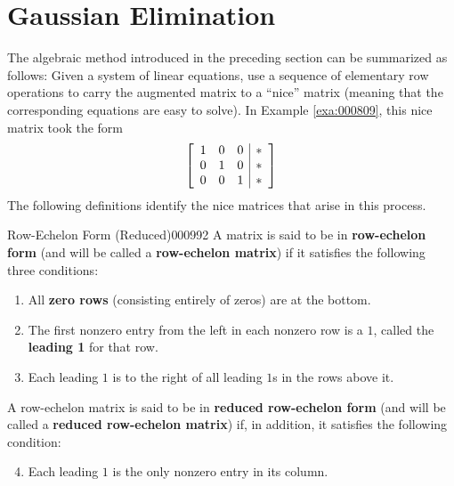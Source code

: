 \section{Gaussian Elimination}
\label{sec:1_2}

The algebraic method introduced in the preceding section can be summarized as follows: Given a system of linear equations, use a sequence of elementary row operations to carry the augmented matrix to a ``nice'' matrix (meaning that the corresponding equations are easy to solve). In Example \ref{exa:000809}, this nice matrix took the form
\begin{equation*}
\left[ \begin{array}{rrr|r}
	1 & 0 & 0 & * \\
	0 & 1 & 0 & * \\
	0 & 0 & 1 & *
\end{array} \right]
\end{equation*}
The following definitions identify the nice matrices that arise in this process.

\newpage
\begin{definition}{Row-Echelon Form (Reduced)}{000992}
A matrix is said to be in \textbf{row-echelon form} (and will be called a \textbf{row-echelon matrix}) if it satisfies the following three conditions:

\begin{enumerate}
\item All \textbf{zero rows} (consisting entirely of zeros) are at the bottom.

\item The first nonzero entry from the left in each nonzero row is a $1$, called the \textbf{leading 1} for that row.

\item Each leading $1$ is to the right of all leading $1$s in the rows above it.

\end{enumerate}

A row-echelon matrix is said to be in \textbf{reduced row-echelon form} (and will be called a \textbf{reduced row-echelon matrix}) if, in addition, it satisfies the following condition:

\begin{enumerate}
\setcounter{enumi}{3}
\item Each leading $1$ is the only nonzero entry in its column.

\end{enumerate}
\end{definition}

